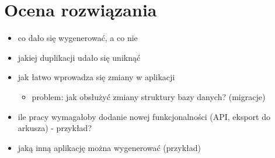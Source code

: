 \chapter{Ocena rozwiązania} \label{chap:evaluation}

\begin{itemize}
 \item co dało się wygenerować, a co nie
 \item jakiej duplikacji udało się uniknąć
 \item jak łatwo wprowadza się zmiany w aplikacji
  \begin{itemize}
   \item problem: jak obsłużyć zmiany struktury bazy danych? (migracje)
  \end{itemize}
 \item ile pracy wymagałoby dodanie nowej funkcjonalności (API, eksport do arkusza) - przykład?
 \item jaką inną aplikację można wygenerować (przykład)
\end{itemize}